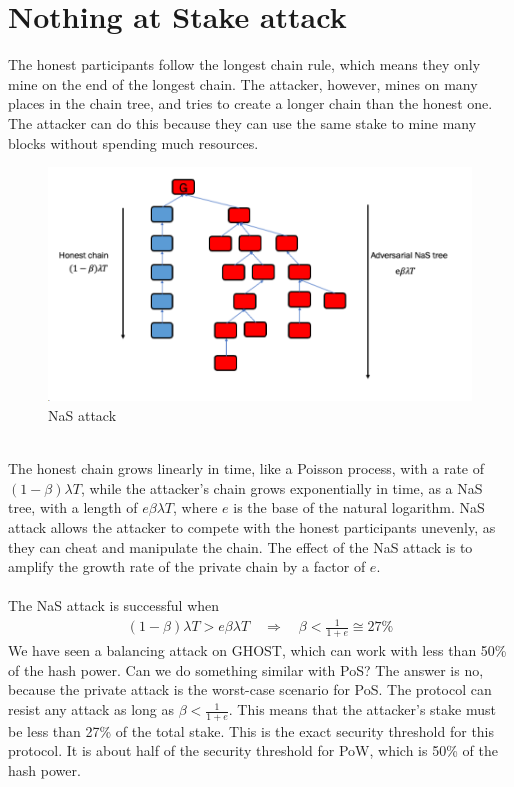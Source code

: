 \section{Nothing at Stake attack}
The honest participants follow the longest chain rule, which means they only mine on the end of the longest chain. The attacker, however, mines on many places in the chain tree, and tries to create a longer chain than the honest one. The attacker can do this because they can use the same stake to mine many blocks without spending much resources. 
\begin{figure}[h!]
    \centering
    \includegraphics[width=0.7\linewidth]{Fig/11/F2}
    \caption{NaS attack}
    \label{fig:f2}
\end{figure}\\
The honest chain grows linearly in time, like a Poisson process, with a rate of $(1 - \beta)\lambda T$, while the attacker’s chain grows exponentially in time, as a NaS tree, with a length of $e\beta\lambda T$, where $e$ is the base of the natural logarithm. NaS attack allows the attacker to compete with the honest participants unevenly, as they can cheat and manipulate the chain.
The effect of the NaS attack is to amplify the growth rate of the private chain by a factor of $e$. \\\\
The NaS attack is successful when 
\begin{align}
    (1 - \beta)\lambda T > e\beta\lambda T \quad \Rightarrow \quad \beta <\frac{1}{1+e}\cong27\%
\end{align}
We have seen a balancing attack on GHOST, which can work with less than 50\% of the hash power. Can we do something similar with PoS? The answer is no, because the private attack is the worst-case scenario for PoS. The protocol can resist any attack as long as $\beta < \frac{1}{1+e}$. This means that the attacker’s stake must be less than 27\% of the total stake. This is the exact security threshold for this protocol. It is about half of the security threshold for PoW, which is 50\% of the hash power.

